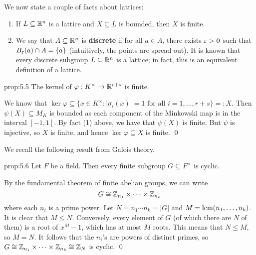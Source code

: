 We now state a couple of facts about lattices: 
\begin{enumerate}[(1)]
    \item If $L \subseteq \mathbb{R}^n$ is a lattice and $X \subseteq L$ is bounded, then 
    $X$ is finite. 
    \item We say that $A \subseteq \mathbb{R}^n$ is {\bf discrete} if for all $a \in A$, 
    there exists $\varepsilon > 0$ such that $B_\varepsilon(a) \cap A = \{a\}$ (intuitively, 
    the points are spread out). It is known 
    that every discrete subgroup $L \subseteq \mathbb{R}^n$ is a lattice; 
    in fact, this is an equivalent definition of a lattice.
\end{enumerate}

\begin{prop}{prop:5.5}
    The kernel of $\varphi : K^\times \to \mathbb{R}^{r+s}$ is finite. 
\end{prop}\vspace{-0.25cm}
\begin{pf}
    We know that $\ker\varphi \subseteq \{x \in K^\times : |\sigma_i(x)| = 1 
    \text{ for all } i = 1, \dots, r+s\} =: X$. Then $\psi(X) \subseteq M_K$ 
    is bounded as each component of the Minkowski map is in the interval $[-1, 1]$. 
    By fact (1) above, we have that $\psi(X)$ is finite. But $\psi$ is injective, 
    so $X$ is finite, and hence $\ker\varphi \subseteq X$ is finite. \qed  
\end{pf}\vspace{-0.25cm}

We recall the following result from Galois theory. 

\begin{prop}{prop:5.6}
    Let $F$ be a field. Then every finite subgroup $G \subseteq F^\times$ is cyclic.
\end{prop}\vspace{-0.25cm}
\begin{pf}
    By the fundamental theorem of finite abelian groups, we can write 
    \[ G \cong \mathbb{Z}_{n_1} \times \cdots \times \mathbb{Z}_{n_k} \] 
    where each $n_i$ is a prime power. Let $N = n_1 \cdots n_k = |G|$ and 
    $M = \operatorname{lcm}(n_1, \dots, n_k)$. It is clear that $M \leq N$. Conversely, every element 
    of $G$ (of which there are $N$ of them) is a root of $x^M - 1$, which has at most 
    $M$ roots. This means that $N \leq M$, so $M = N$. It follows that the $n_i$'s 
    are powers of distinct primes, so $G \cong \mathbb{Z}_{n_1} \times \cdots \times \mathbb{Z}_{n_k} 
    \cong \mathbb{Z}_N$ is cyclic. \qed 
\end{pf}\vspace{-0.25cm}

